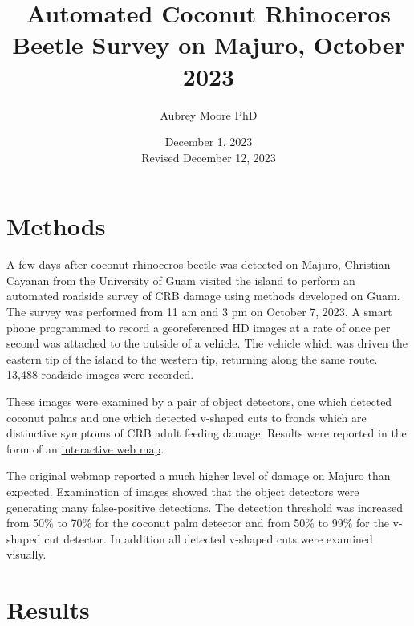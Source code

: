\documentclass[12pt,letterpaper,english,bibliography=totocnumbered, abstract=on]{scrartcl}
\begin{document}
\titlehead{DRAFT TECHNICAL REPORT}

\title{Automated Coconut Rhinoceros Beetle Survey on Majuro, October 2023}

\author{Aubrey Moore PhD}

\date{December 1, 2023\\Revised December 12, 2023}

\maketitle


\pagebreak

\section{Methods}

A few days after coconut rhinoceros beetle was detected on Majuro, Christian Cayanan from the University of Guam visited the island to perform an automated roadside survey of CRB damage using methods developed on Guam. The survey was performed from 11 am and 3 pm on October 7, 2023. A smart phone programmed to record a georeferenced HD images at a rate of once per second was attached to the outside of a vehicle. The vehicle which was driven the eastern tip of the island to the western tip, returning along the same route. 13,488 roadside images were recorded.

These images were examined by a pair of object detectors, one which detected coconut palms and one which detected v-shaped cuts to fronds which are distinctive symptoms of CRB adult feeding damage. Results were reported in the form of an \href{https://aubreymoore.github.io/Majuro-CRB-Damage-Map-2023-10/webmap/#12/7.1098/171.2099}{interactive web map}. 

The original webmap reported a much higher level of damage on Majuro than expected. Examination of images showed that the object detectors were generating many false-positive detections. The detection threshold was increased from 50\% to 70\% for the coconut palm detector and from 50\% to 99\% for the v-shaped cut detector. In addition all detected v-shaped cuts were examined visually.

\section{Results}
\end{document}
